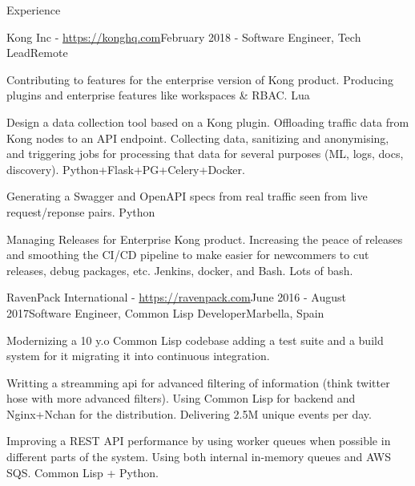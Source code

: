 \documentclass{resume} %
\begin{document}
\begin{rSection}{Experience}
  \begin{rSubsection}{Kong Inc - \url{https://konghq.com}}{February 2018 - }{Software Engineer, Tech Lead}{Remote}
  \item Contributing to features for the enterprise version of Kong
    product. Producing plugins and enterprise features like workspaces
    & RBAC. Lua
  \item Design a data collection tool based on a Kong
    plugin. Offloading traffic data from Kong nodes to an API
    endpoint. Collecting data, sanitizing and anonymising, and
    triggering jobs for processing that data for several purposes (ML,
    logs, docs, discovery). Python+Flask+PG+Celery+Docker.
  \item Generating a Swagger and OpenAPI specs from real traffic seen
    from live request/reponse pairs. Python
  \item Managing Releases for Enterprise Kong product. Increasing the
    peace of releases and smoothing the CI/CD pipeline to make easier
    for newcommers to cut releases, debug packages, etc. Jenkins,
    docker, and Bash. Lots of bash.
\end{rSubsection}


\begin{rSubsection}{RavenPack International - \url{https://ravenpack.com}}{June 2016  - August 2017}{Software Engineer, Common Lisp Developer}{Marbella, Spain}
\item Modernizing a 10 y.o Common Lisp codebase adding a test suite
  and a build system for it migrating it into continuous
  integration.
\item Writting a streamming api for advanced filtering of information
  (think twitter hose with more advanced filters). Using Common Lisp
  for backend and Nginx+Nchan for the distribution.  Delivering 2.5M
  unique events per day.
\item Improving a REST API performance by using worker queues when
  possible in different parts of the system. Using both internal
  in-memory queues and AWS SQS. Common Lisp + Python.
\end{rSubsection}



\end{rSection}
\end{document}
